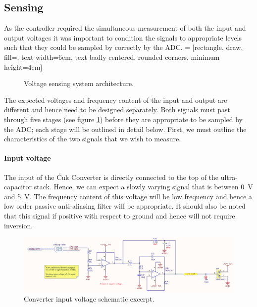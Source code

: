 \subsection{Sensing}
As the controller required the simultaneous measurement of both the input and output voltages it was important to condition the signals to appropriate levels such that they could be sampled by correctly by the ADC.
 = [rectangle, draw, fill=\myblue, 
    text width=6em, text badly centered, rounded corners, minimum height=4em]
\begin{figure}[H]
\centering
{}
\caption{Voltage sensing system architecture.}
\label{fig:sensing_system}
\end{figure}
The expected voltages and frequency content of the input and output are different and hence need to be designed separately. Both signals must past through five stages (see figure \ref{fig:sensing_system}) before they are appropriate to be sampled by the ADC; each stage will be outlined in detail below. First, we must outline the characteristics of the two signals that we wish to measure.

\paragraph{Input voltage}
The input of the \'Cuk Converter is directly connected to the top of the ultra-capacitor stack. Hence, we can expect a slowly varying signal that is between \SI{0}{V} and \SI{5}{V}. The frequency content of this voltage will be low frequency and hence a low order passive anti-aliasing filter will be appropriate. It should also be noted that this signal if positive with respect to ground and hence will not require inversion.
\begin{figure}[H]
    \centering
    \includegraphics[width = 14cm]{figures/hardware/input_sense.pdf}
    \caption{Converter input voltage schematic excerpt.}
    \label{fig:input_sense}
\end{figure}

